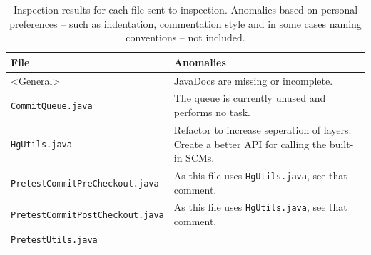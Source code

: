 \documentclass[a4paper]{article}
\begin{document}
\begin{table}[!ht]
	\centering
	\begin{tabular}{| p{6cm} | p{5cm} |}
			\hline
			\textbf{File}&\textbf{Anomalies} \\
			\hline
			<General> & JavaDocs are missing or incomplete. \\
			\hline
			\texttt{CommitQueue.java} &
				The queue is currently unused and performs no task.\\
			\hline
			\texttt{HgUtils.java} &
				Refactor to increase seperation of layers. Create a better API
				for calling the built-in SCMs.\\
			\hline
			\texttt{PretestCommitPreCheckout.java} &
				As this file uses \texttt{HgUtils.java}, see that comment. \\
			\hline
			\texttt{PretestCommitPostCheckout.java} &
				As this file uses \texttt{HgUtils.java}, see that comment. \\
			\hline
			\texttt{PretestUtils.java} & \\
			\hline
		\end{tabular}
		\caption{Inspection results for each file sent to inspection. Anomalies based
		on personal preferences -- such as indentation, commentation style and in some
		cases naming conventions -- not included.}
		\label{tab:inspection}
\end{table}
\end{document}
